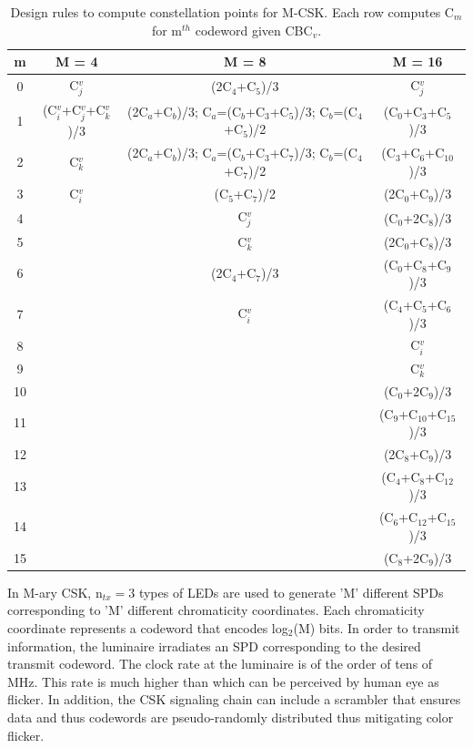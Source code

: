 \documentclass[10pt,letterpaper]{article}
\begin{document}
\begin{table}[t]
\centering
\begin{tabular}{|c|c|c|c|}
\hline
\textbf{m} & \textbf{M = 4} & \textbf{M = 8} & \textbf{M = 16} \\
\hline
0 & C$^{v}_{j}$ & (2C$_{4}$+C$_{5}$)/3 & C$^{v}_{j}$\\
1 & (C$^{v}_{i}$+C$^{v}_{j}$+C$^{v}_{k}$)/3 & (2C$_{a}$+C$_{b}$)/3; C$_{a}$=(C$_{b}$+C$_{3}$+C$_{5}$)/3; C$_{b}$=(C$_{4}$+C$_{5}$)/2 & (C$_{0}$+C$_{3}$+C$_{5}$)/3 \\
2 & C$^{v}_{k}$ & (2C$_{a}$+C$_{b}$)/3; C$_{a}$=(C$_{b}$+C$_{3}$+C$_{7}$)/3; C$_{b}$=(C$_{4}$+C$_{7}$)/2 & (C$_{3}$+C$_{6}$+C$_{10}$)/3 \\
3 & C$^{v}_{i}$ & (C$_{5}$+C$_{7}$)/2 & (2C$_{0}$+C$_{9}$)/3 \\
\cline{2-2}
4 & & C$^{v}_{j}$ & (C$_{0}$+2C$_{8}$)/3 \\
5 & & C$^{v}_{k}$ & (2C$_{0}$+C$_{8}$)/3 \\
6 & & (2C$_{4}$+C$_{7}$)/3 & (C$_{0}$+C$_{8}$+C$_{9}$)/3 \\
7 & & C$^{v}_{i}$ & (C$_{4}$+C$_{5}$+C$_{6}$)/3 \\
\cline{3-3}
8 & & & C$^{v}_{i}$ \\
9 & & & C$^{v}_{k}$ \\
10 & & & (C$_{0}$+2C$_{9}$)/3 \\
11 & & & (C$_{9}$+C$_{10}$+C$_{15}$)/3 \\
12 & & & (2C$_{8}$+C$_{9}$)/3 \\
13 & & & (C$_{4}$+C$_{8}$+C$_{12}$)/3 \\
14 & & & (C$_{6}$+C$_{12}$+C$_{15}$)/3 \\
15 & & & (C$_{8}$+2C$_{9}$)/3 \\
\hline
\end{tabular}
\caption{Design rules to compute constellation points for M-CSK. Each row computes C$_{m}$ for m$^{th}$ codeword given CBC$_{v}$.}
\label{tMCSK}
\end{table}

In M-ary CSK, n$_{tx}=3$ types of LEDs are used to generate 'M' different SPDs corresponding to 'M' different chromaticity coordinates. Each chromaticity coordinate represents a codeword that encodes log$_{2}$(M) bits. In order to transmit information, the luminaire irradiates an SPD corresponding to the desired transmit codeword. The clock rate at the luminaire is of the order of tens of MHz. This rate is much higher than which can be perceived by human eye as flicker. In addition, the CSK signaling chain can include a scrambler that ensures data and thus codewords are pseudo-randomly distributed thus mitigating color flicker.
\end{document}
